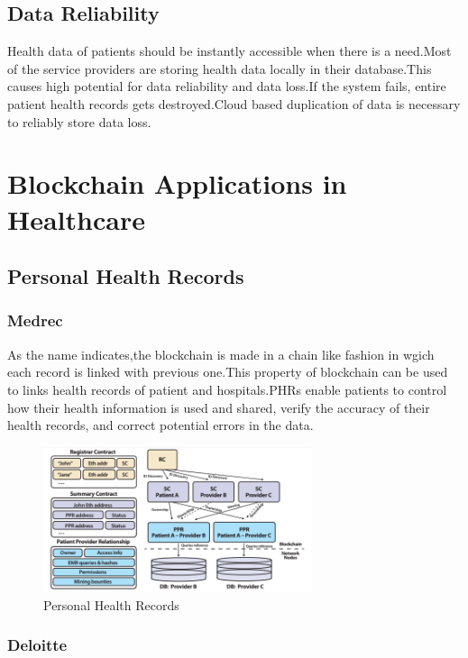 \documentclass[12pt]{report}
\begin{document}
\section{Data Reliability}
Health data of patients should be instantly accessible when there is a need.Most of the service providers are storing health data locally in their database.This causes high potential for data reliability and data loss.If the system fails, entire patient health records gets destroyed.Cloud based duplication of data is necessary to reliably store data loss.


\chapter{Blockchain Applications in Healthcare}
\section{Personal Health Records}
\subsection{Medrec}
As the name indicates,the blockchain is made in a chain like fashion in wgich each record is linked with previous one.This property of blockchain can be used to links health records of patient and hospitals.PHRs enable patients to control how their health information is used and shared, verify
the accuracy of their health records, and correct potential errors in the data.
\begin{figure}[H]
\centering
\includegraphics[width=0.7\textwidth]{ppr.png}
\caption{Personal Health Records}
\label{ppr}
\end{figure}
\subsection{Deloitte}
\end{document}
